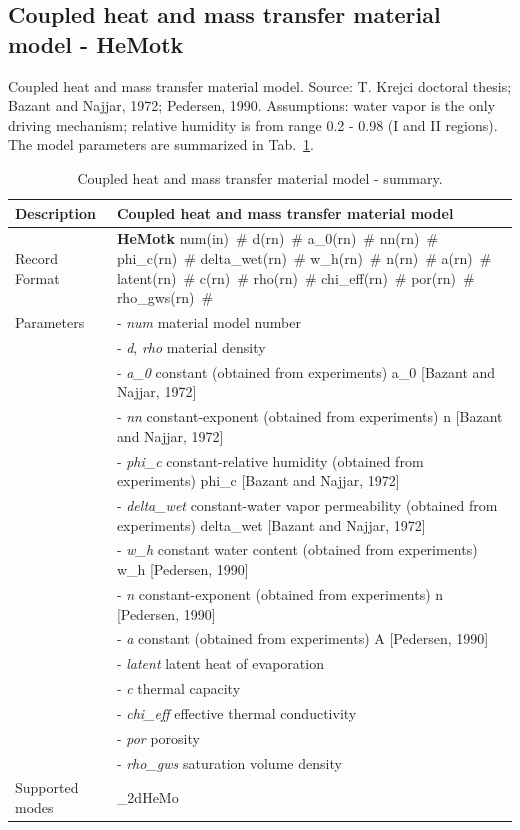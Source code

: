 \documentclass[a4paper]{article}
\newcommand{\descitem}[1]{{\noindent \bf #1}}
\newcommand{\elemparam}[2]{{{#1\tiny (#2)}~\#}}
\newcommand{\param}[1]{{\it #1}}
\begin{document}
\subsection{Coupled heat and mass transfer material model - HeMotk}
Coupled heat and mass transfer material model.
Source: T. Krejci doctoral thesis; Bazant and Najjar, 1972;
Pedersen, 1990. Assumptions: water vapor is the only driving
mechanism; relative humidity is from range 0.2 - 0.98 (I and II
regions). The model parameters are summarized
in Tab.~\ref{hemotk_table}.
\begin{table}[!htb]
\begin{tabular}{|l|p{9cm}|}
\hline
Description & Coupled heat and mass transfer material model\\
\hline
Record Format & \descitem{HeMotk} \elemparam{num}{in}
\elemparam{d}{rn} \elemparam{a\_0}{rn} \elemparam{nn}{rn}
\elemparam{phi\_c}{rn} \elemparam{delta\_wet}{rn}
\elemparam{w\_h}{rn} \elemparam{n}{rn}
\elemparam{a}{rn} \elemparam{latent}{rn}
\elemparam{c}{rn} \elemparam{rho}{rn}
\elemparam{chi\_eff}{rn} \elemparam{por}{rn}
\elemparam{rho\_gws}{rn}\\
Parameters &- \param{num} material model number\\
&- \param{d}, \param{rho} material density\\
&- \param{a\_0} constant (obtained from experiments) a\_0 [Bazant and Najjar, 1972]\\
&- \param{nn} constant-exponent (obtained from experiments) n [Bazant
and Najjar, 1972]\\
&- \param{phi\_c} constant-relative humidity  (obtained from experiments) phi\_c [Bazant and Najjar, 1972]\\
&- \param{delta\_wet} constant-water vapor permeability (obtained from
experiments) delta\_wet [Bazant and Najjar, 1972]\\
&- \param{w\_h} constant water content (obtained from experiments) w\_h
[Pedersen, 1990]\\
&- \param{n} constant-exponent (obtained from experiments) n [Pedersen, 1990]\\
&- \param{a} constant (obtained from experiments) A [Pedersen, 1990]\\
&- \param{latent} latent heat of evaporation\\
&- \param{c} thermal capacity\\
&- \param{chi\_eff} effective thermal conductivity\\
&- \param{por} porosity\\
&- \param{rho\_gws} saturation volume density\\
Supported modes& \_2dHeMo\\
\hline
\end{tabular}
\caption{Coupled heat and mass transfer material model - summary.}
\label{hemotk_table}
\end{table}
\end{document}
